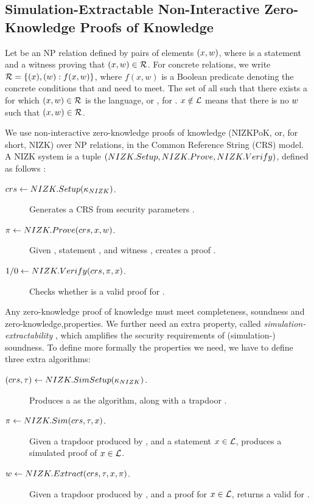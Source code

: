 \subsection{Simulation-Extractable Non-Interactive Zero-Knowledge
  Proofs of Knowledge}
\label{sapp:nizk}

Let \NIZKRel be an NP relation defined by pairs of elements $(x,w)$,
where \NIZKx is a statement and \NIZKw a witness proving that $(x,w)
\in \mathcal{R}$. For concrete relations, we write $\mathcal{R} = \lbrace (x),
(w): f(x,w) \rbrace$, where $f(x,w)$ is a Boolean predicate denoting the
concrete conditions that \NIZKx and \NIZKw need to meet. The set of all \NIZKx
such that there exists a \NIZKw for which $(x,w) \in \mathcal{R}$ is the
language, or \NIZKLang, for \NIZKRel. $x \notin \mathcal{L}$ means that
there is no $w$ such that $(x,w) \in \mathcal{R}$.

We use non-interactive zero-knowledge proofs of knowledge (NIZKPoK, or, for
short, NIZK) over NP relations, in the Common Reference String (CRS) model. A
NIZK system is a tuple $(NIZK.Setup,NIZK.Prove,NIZK.Verify)$, defined as follows
\cite{gos06}:

\begin{description}
\item[$crs \gets NIZK.Setup(\kappa_{NIZK})$.] Generates a CRS \NIZKcrs from
  security parameters \NIZKsecpar.
\item[$\pi \gets NIZK.Prove(crs,x,w)$.] Given \NIZKcrs,
  statement \NIZKx, and witness \NIZKw, creates a proof \NIZKproof.
\item[$1/0 \gets NIZK.Verify(crs,\pi,x)$.] Checks whether
  \NIZKproof is a valid proof for \NIZKx.
\end{description}

Any zero-knowledge proof of knowledge must meet completeness, soundness and
zero-knowledge,properties. We further need an extra property, called
\emph{simulation-extractability} \cite{cl06}, which amplifies the security
requirements of (simulation-) soundness.
%
To define more formally the properties we need, we have to define three extra
algorithms:

\begin{description}
\item[$(crs,\tau) \gets NIZK.SimSetup(\kappa_{NIZK})$.] Produces a
  \NIZKcrs as the \NIZKSetup algorithm, along with a trapdoor \NIZKtrap.
\item[$\pi \gets NIZK.Sim(crs,\tau,x)$.] Given a trapdoor
  \NIZKtrap produced by \NIZKSimSetup, and a statement $x \in \mathcal{L}$,
  produces a simulated proof \NIZKproof of $x \in \mathcal{L}$.
\item[$w \gets NIZK.Extract(crs,\tau,x,\pi)$.] Given
  a trapdoor \NIZKtrap produced by \NIZKSimSetup, and a proof \NIZKproof for
  $x \in \mathcal{L}$, returns a valid \NIZKw for \NIZKx.
\end{description}

